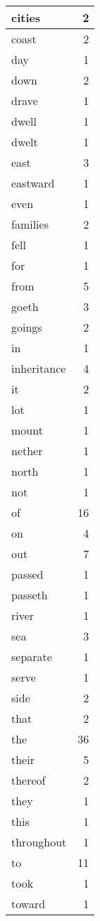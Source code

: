 \begin{center}
\begin{longtable}{l|r}
cities & 2 \\ \hline
coast & 2 \\ \hline
day & 1 \\ \hline
down & 2 \\ \hline
drave & 1 \\ \hline
dwell & 1 \\ \hline
dwelt & 1 \\ \hline
east & 3 \\ \hline
eastward & 1 \\ \hline
even & 1 \\ \hline
families & 2 \\ \hline
fell & 1 \\ \hline
for & 1 \\ \hline
from & 5 \\ \hline
goeth & 3 \\ \hline
goings & 2 \\ \hline
in & 1 \\ \hline
inheritance & 4 \\ \hline
it & 2 \\ \hline
lot & 1 \\ \hline
mount & 1 \\ \hline
nether & 1 \\ \hline
north & 1 \\ \hline
not & 1 \\ \hline
of & 16 \\ \hline
on & 4 \\ \hline
out & 7 \\ \hline
passed & 1 \\ \hline
passeth & 1 \\ \hline
river & 1 \\ \hline
sea & 3 \\ \hline
separate & 1 \\ \hline
serve & 1 \\ \hline
side & 2 \\ \hline
that & 2 \\ \hline
the & 36 \\ \hline
their & 5 \\ \hline
thereof & 2 \\ \hline
they & 1 \\ \hline
this & 1 \\ \hline
throughout & 1 \\ \hline
to & 11 \\ \hline
took & 1 \\ \hline
toward & 1 \\ \hline

\end{longtable}
\end{center}
